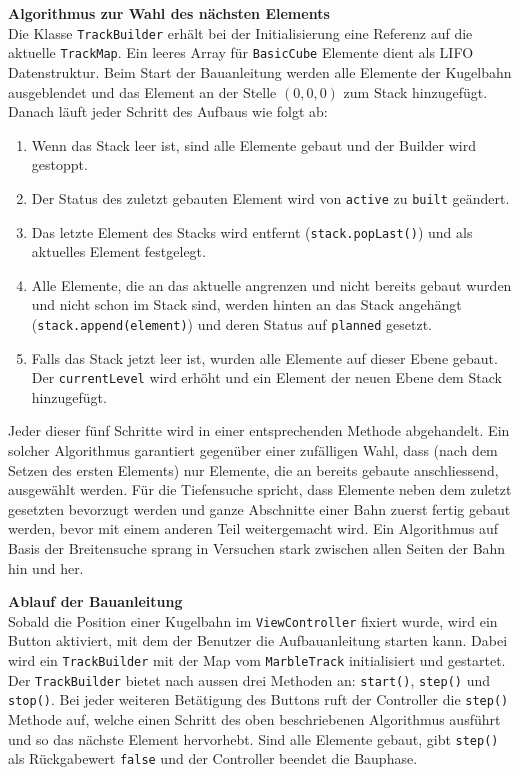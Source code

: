 \begin{description}
	\textbf{Algorithmus zur Wahl des nächsten Elements}\\
	Die Klasse \texttt{TrackBuilder} erhält bei der Initialisierung eine Referenz auf die aktuelle \texttt{TrackMap}. Ein leeres Array für \texttt{BasicCube} Elemente dient als LIFO Datenstruktur. Beim Start der Bauanleitung werden alle Elemente der Kugelbahn ausgeblendet und das Element an der Stelle $(0,0,0)$ zum Stack hinzugefügt. Danach läuft jeder Schritt des Aufbaus wie folgt ab:
	\begin{enumerate}
		\item Wenn das Stack leer ist, sind alle Elemente gebaut und der Builder wird gestoppt.
		\item Der Status des zuletzt gebauten Element wird von \texttt{active} zu \texttt{built} geändert.
		\item Das letzte Element des Stacks wird entfernt (\texttt{stack.popLast()}) und als aktuelles Element festgelegt.
		\item Alle Elemente, die an das aktuelle angrenzen und nicht bereits gebaut wurden und nicht schon im Stack sind, werden hinten an das Stack angehängt (\texttt{stack.append(element)}) und deren Status auf \texttt{planned} gesetzt.
		\item Falls das Stack jetzt leer ist, wurden alle Elemente auf dieser Ebene gebaut. Der \texttt{currentLevel} wird erhöht und ein Element der neuen Ebene dem Stack hinzugefügt.
	\end{enumerate}

	Jeder dieser fünf Schritte wird in einer entsprechenden Methode abgehandelt. Ein solcher Algorithmus garantiert gegenüber einer zufälligen Wahl, dass (nach dem Setzen des ersten Elements) nur Elemente, die an bereits gebaute anschliessend, ausgewählt werden. Für die Tiefensuche spricht, dass Elemente neben dem zuletzt gesetzten bevorzugt werden und ganze Abschnitte einer Bahn zuerst fertig gebaut werden, bevor mit einem anderen Teil weitergemacht wird. Ein Algorithmus auf Basis der Breitensuche sprang in Versuchen stark zwischen allen Seiten der Bahn hin und her.

	\textbf{Ablauf der Bauanleitung}\\
	Sobald die Position einer Kugelbahn im \texttt{ViewController} fixiert wurde, wird ein Button aktiviert, mit dem der Benutzer die Aufbauanleitung starten kann. Dabei wird ein \texttt{TrackBuilder} mit der Map vom \texttt{MarbleTrack} initialisiert und gestartet. Der \texttt{TrackBuilder} bietet nach aussen drei Methoden an: \texttt{start()}, \texttt{step()} und \texttt{stop()}. Bei jeder weiteren Betätigung des Buttons ruft der Controller die \texttt{step()} Methode auf, welche einen Schritt des oben beschriebenen Algorithmus ausführt und so das nächste Element hervorhebt. Sind alle Elemente gebaut, gibt \texttt{step()} als Rückgabewert \texttt{false} und der Controller beendet die Bauphase.

\end{description}
